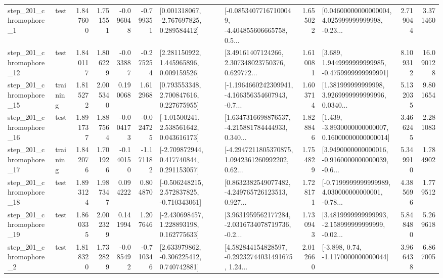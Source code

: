 \begin{tabular}{llrrrrllrlrr}
   step\_201\_chromophore\_1 &      test &      1.847600 &    1.751551 &     -0.096048 & -0.799351 &    [0.001318067, -2.767697825, 0.289584412] &  [-0.08534077167100049, -4.404855606665758, 0.5... &       1.655022 &  [0.04600000000000004, 4.025999999999998, -0.23... &            2.719044 &          3.371460 \\
  step\_201\_chromophore\_12 &      test &      1.840117 &    1.806229 &     -0.033887 & -0.275254 &     [2.281150922, 1.445965896, 0.009159526] &  [3.49161407124266, 2.307348023750376, 0.629772... &       1.610081 &   [3.689, 1.9449999999999985, -0.4759999999999991] &            8.109312 &         16.090128 \\
  step\_201\_chromophore\_15 &  training &      1.815272 &    2.005340 &      0.190068 &  1.612968 &     [0.793553348, 2.700847616, 0.227675955] &  [-1.1964660242309941, -4.166356354607943, -0.7... &       1.603714 &  [1.381999999999998, 3.9269999999999996, 0.0340... &            5.132035 &          9.801654 \\
  step\_201\_chromophore\_16 &      test &      1.891737 &    1.887564 &     -0.004173 & -0.024725 &     [-1.01500241, 2.538561642, 0.043616173] &  [1.6347316698876537, -4.215881784444933, 0.340... &       1.828846 &  [1.439, -3.8930000000000007, 0.16000000000000014] &            3.466245 &          2.281083 \\
  step\_201\_chromophore\_17 &  training &      1.842076 &    1.701926 &     -0.140150 & -1.171182 &    [-2.709872944, 0.417740844, 0.291153057] &  [-4.2947211805370875, 1.0942361260992202, 0.62... &       1.754829 &  [3.9490000000000016, -0.9160000000000039, -0.6... &            5.349910 &          1.784902 \\
  step\_201\_chromophore\_18 &      test &      1.893124 &    1.987347 &      0.094222 &  0.804870 &   [-0.506248215, 2.572837825, -0.710343061] &  [0.8632382549077482, -4.249765726123513, 0.927... &       1.728171 &  [-0.7199999999999989, 4.030000000000001, -0.78... &            4.385696 &          1.779512 \\
  step\_201\_chromophore\_19 &      test &      1.860335 &    2.002329 &      0.141994 &  1.207646 &    [-2.430698457, 1.228893198, 0.162775633] &  [3.9631959562177284, -2.0316734078719736, -0.2... &       1.730943 &  [3.4819999999999993, -2.158999999999999, -0.02... &            5.848480 &          5.269618 \\
   step\_201\_chromophore\_2 &      test &      1.818320 &    1.732829 &     -0.085492 & -0.710346 &    [2.633979862, -0.306225412, 0.740742881] &  [4.582844154828597, -0.29232744031491675, 1.24... &       2.012660 &                [-3.898, 0.74, -1.1170000000000044] &            3.966438 &          6.867005 \\

\end{tabular}
